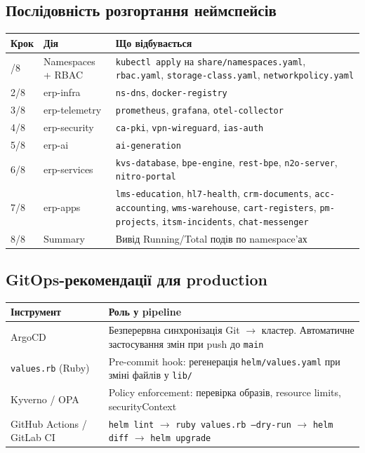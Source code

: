 \documentclass[12pt,a4paper]{article}
\begin{document}
\newpage
\subsection{Послідовність розгортання неймспейсів}

\begin{longtable}{C{1.2cm} L{3.5cm} L{9.3cm}}
\toprule
{}
\color{primary}\textbf{Крок} &
\color{primary}\textbf{Дія} &
\color{primary}\textbf{Що відбувається} \\
\midrule\endhead\bottomrule{}/8 & Namespaces + RBAC & \texttt{kubectl apply} на \texttt{share/namespaces.yaml}, \texttt{rbac.yaml}, \texttt{storage-class.yaml}, \texttt{networkpolicy.yaml} \\[2pt]
2/8 & erp-infra        & \texttt{ns-dns}, \texttt{docker-registry} \\[2pt]
3/8 & erp-telemetry    & \texttt{prometheus}, \texttt{grafana}, \texttt{otel-collector} \\[2pt]
4/8 & erp-security     & \texttt{ca-pki}, \texttt{vpn-wireguard}, \texttt{ias-auth} \\[2pt]
5/8 & erp-ai           & \texttt{ai-generation} \\[2pt]
6/8 & erp-services     & \texttt{kvs-database}, \texttt{bpe-engine}, \texttt{rest-bpe}, \texttt{n2o-server}, \texttt{nitro-portal} \\[2pt]
7/8 & erp-apps         & \texttt{lms-education}, \texttt{hl7-health}, \texttt{crm-documents}, \texttt{acc-accounting}, \texttt{wms-warehouse}, \texttt{cart-registers}, \texttt{pm-projects}, \texttt{itsm-incidents}, \texttt{chat-messenger} \\[2pt]
8/8 & Summary          & Вивід Running/Total подів по namespace'ах \\[2pt]
\end{longtable}

\subsection{GitOps-рекомендації для production}

\begin{longtable}{L{4cm} L{10cm}}
\toprule
{}
\color{primary}\textbf{Інструмент} & \color{primary}\textbf{Роль у pipeline} \\
\midrule\endhead\bottomrule\endfoot
ArgoCD
  & Безперервна синхронізація Git $\rightarrow$ кластер.
    Автоматичне застосування змін при push до \texttt{main} \\[4pt]
\texttt{values.rb} (Ruby)
  & Pre-commit hook: регенерація \texttt{helm/values.yaml}
    при зміні файлів у \texttt{lib/} \\[4pt]
Kyverno / OPA
  & Policy enforcement: перевірка образів, resource limits,
    securityContext \\[4pt]
GitHub Actions / GitLab CI
  & \texttt{helm lint} $\to$ \texttt{ruby values.rb --dry-run}
    $\to$ \texttt{helm diff} $\to$ \texttt{helm upgrade} \\[4pt]
\end{longtable}
\end{document}
